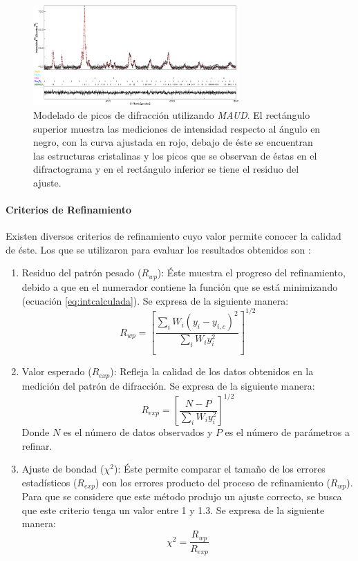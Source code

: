 \documentclass[../main.tex]{subfiles}
\begin{document}
\begin{figure}[H]
    \centering
    \includegraphics[width=0.7\textwidth]{fig/Rietveld.png}
    \caption{Modelado de picos de difracción utilizando \textit{MAUD}. El rectángulo superior muestra las mediciones de intensidad respecto al ángulo en negro, con la curva ajustada en rojo, debajo de éste se encuentran las estructuras cristalinas y los picos que se observan de éstas en el difractograma y en el rectángulo inferior se tiene el residuo del ajuste.}
    \label{fig:picosrietveld}
\end{figure}
\paragraph{Criterios de Refinamiento} \label{sec:refinamiento}
Existen diversos criterios de refinamiento cuyo valor permite conocer la calidad de éste. Los que se utilizaron para evaluar los resultados obtenidos son \cite{Rietveld}:
\begin{enumerate}[label=\textbf{\alph*)}]
    \item Residuo del patrón pesado ($R_{wp}$): Éste muestra el progreso del refinamiento, debido a que en el numerador contiene la función que se está minimizando (ecuación \ref{eq:intcalculada}). Se expresa de la siguiente manera:
    \begin{equation}
        R_{wp}=\left[\dfrac{\sum_i W_i\left(y_i-y_{i,c}\right)^2}{\sum_i W_i y_i^2}\right]^{1/2}
        \label{eq:patronpesado}
    \end{equation}
    \item Valor esperado ($R_{exp}$): Refleja la calidad de los datos obtenidos en la medición del patrón de difracción. Se expresa de la siguiente manera:
    \begin{equation}
        R_{exp}=\left[\dfrac{N-P}{\sum_i W_i y_i^2}\right]^{1/2}
        \label{eq:valoresperado}
    \end{equation}
    Donde $N$ es el número de datos observados y $P$ es el número de parámetros a refinar.
    \item Ajuste de bondad ($\chi^2$): Éste permite comparar el tamaño de los errores estadísticos ($R_{exp}$) con los errores producto del proceso de refinamiento ($R_{wp}$). Para que se considere que este método produjo un ajuste correcto, se busca que este criterio tenga un valor entre 1 y 1.3. Se expresa de la siguiente manera:
    \begin{equation}
        \chi^2=\dfrac{R_{wp}}{R_{exp}}
        \label{eq:ajustebondad}
    \end{equation}
\end{enumerate}
\end{document}

